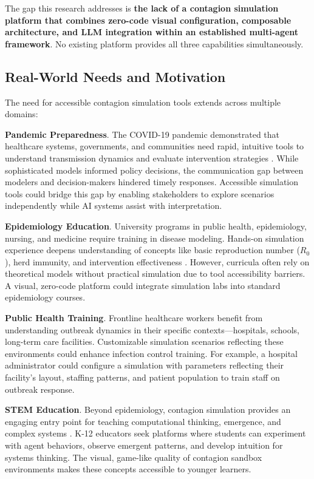 The gap this research addresses is \textbf{the lack of a contagion simulation platform that combines zero-code visual configuration, composable architecture, and LLM integration within an established multi-agent framework}. No existing platform provides all three capabilities simultaneously.

\subsection{Real-World Needs and Motivation}

The need for accessible contagion simulation tools extends across multiple domains:

\textbf{Pandemic Preparedness}. The COVID-19 pandemic demonstrated that healthcare systems, governments, and communities need rapid, intuitive tools to understand transmission dynamics and evaluate intervention strategies \cite{flaxman2020estimating}. While sophisticated models informed policy decisions, the communication gap between modelers and decision-makers hindered timely responses. Accessible simulation tools could bridge this gap by enabling stakeholders to explore scenarios independently while AI systems assist with interpretation.

\textbf{Epidemiology Education}. University programs in public health, epidemiology, nursing, and medicine require training in disease modeling. Hands-on simulation experience deepens understanding of concepts like basic reproduction number ($R_0$), herd immunity, and intervention effectiveness \cite{fine2011herd}. However, curricula often rely on theoretical models without practical simulation due to tool accessibility barriers. A visual, zero-code platform could integrate simulation labs into standard epidemiology courses.

\textbf{Public Health Training}. Frontline healthcare workers benefit from understanding outbreak dynamics in their specific contexts---hospitals, schools, long-term care facilities. Customizable simulation scenarios reflecting these environments could enhance infection control training. For example, a hospital administrator could configure a simulation with parameters reflecting their facility's layout, staffing patterns, and patient population to train staff on outbreak response.

\textbf{STEM Education}. Beyond epidemiology, contagion simulation provides an engaging entry point for teaching computational thinking, emergence, and complex systems \cite{wilensky2014agent}. K-12 educators seek platforms where students can experiment with agent behaviors, observe emergent patterns, and develop intuition for systems thinking. The visual, game-like quality of contagion sandbox environments makes these concepts accessible to younger learners.

